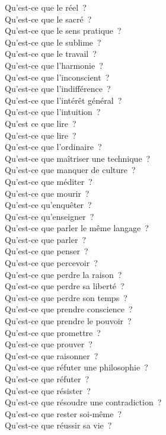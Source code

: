 \documentclass[a4paper,12pt]{article}
\begin{document}
Qu'est-ce que le réel ? \\
Qu'est-ce que le sacré ? \\
Qu'est-ce que le sens pratique ? \\
Qu'est-ce que le sublime ? \\
Qu'est-ce que le travail ? \\
Qu'est-ce que l'harmonie ? \\
Qu'est-ce que l'inconscient ? \\
Qu'est-ce que l'indifférence ? \\
Qu'est-ce que l'intérêt général ? \\
Qu'est-ce que l'intuition ? \\
Qu'est ce que lire ? \\
Qu'est-ce que lire ? \\
Qu'est-ce que l'ordinaire ? \\
Qu'est-ce que maîtriser une technique ? \\
Qu'est-ce que manquer de culture ? \\
Qu'est-ce que méditer ? \\
Qu'est-ce que mourir ? \\
Qu'est-ce qu'enquêter ? \\
Qu'est-ce qu'enseigner ? \\
Qu'est-ce que parler le même langage ? \\
Qu'est-ce que parler ? \\
Qu'est-ce que penser ? \\
Qu'est-ce que percevoir ? \\
Qu'est-ce que perdre la raison ? \\
Qu'est-ce que perdre sa liberté ? \\
Qu'est-ce que perdre son temps ? \\
Qu'est-ce que prendre conscience ? \\
Qu'est-ce que prendre le pouvoir ? \\
Qu'est-ce que promettre ? \\
Qu'est-ce que prouver ? \\
Qu'est-ce que raisonner ? \\
Qu'est-ce que réfuter une philosophie ? \\
Qu'est-ce que réfuter ? \\
Qu'est-ce que résister ? \\
Qu'est-ce que résoudre une contradiction ? \\
Qu'est-ce que rester soi-même ? \\
Qu'est-ce que réussir sa vie ? \\
\end{document}
